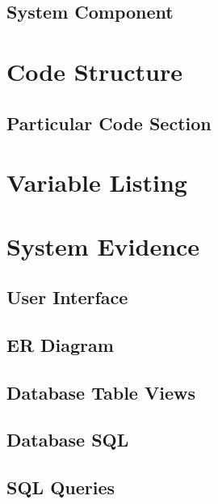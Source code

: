 \subsection{System Component}

\section{Code Structure}

\subsection{Particular Code Section}
\begin{comment}
\begin{figure}[H]
    \pythonfile[firstline=5,lastline=10]{./tex/function_programs/print_function.py}
    \caption{The print() function} \label{fig:print_function}
\end{figure}
\end{comment}

\section{Variable Listing}

\section{System Evidence}

\subsection{User Interface}

\subsection{ER Diagram}

\subsection{Database Table Views}

\subsection{Database SQL}

\subsection{SQL Queries}

